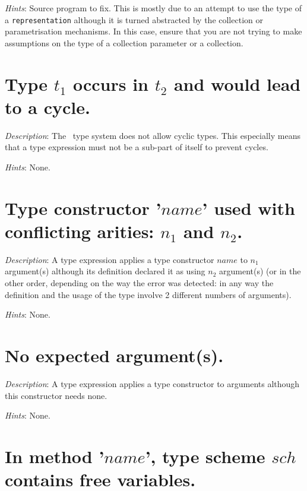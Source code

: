 {\em Hints}: Source program to fix. This is mostly due to an attempt
to use the type of a {\tt representation} although it is turned
abstracted by the collection or parametrisation mechanisms. In this
case, ensure that you are not trying to make assumptions on the type
 of a collection parameter or a collection.



\section*{Type $t_1$ occurs in $t_2$ and would lead to a cycle.}
{\em Description}: The \focal\ type system does not allow cyclic
types. This especially means that a type expression must not be a
sub-part of itself to prevent cycles.

{\em Hints}: None.



\section*{Type constructor '$name$' used with conflicting arities:
  $n_1$ and $n_2$.}
{\em Description}: A type expression applies a type constructor $name$
to $n_1$ argument(s) although its definition declared it as using $n_2$
argument(s) (or in the other order, depending on the way the error was
detected: in any way the definition and the usage of the type involve
2 different numbers of arguments).

{\em Hints}: None.



\section*{No expected argument(s).}
{\em Description}: A type expression applies a type constructor to
arguments although this constructor needs none.

{\em Hints}: None.



\section*{In method '$name$', type scheme $sch$ contains free variables.}

